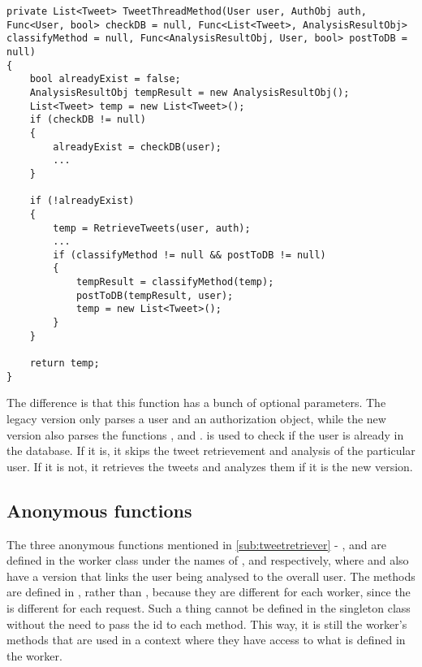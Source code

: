\begin{minipage}[H]{\linewidth}
\begin{lstlisting}[caption = The TweetThreadMethod function, label =
tweetthreadmethod]
private List<Tweet> TweetThreadMethod(User user, AuthObj auth, Func<User, bool> checkDB = null, Func<List<Tweet>, AnalysisResultObj> classifyMethod = null, Func<AnalysisResultObj, User, bool> postToDB = null)
{
    bool alreadyExist = false;
    AnalysisResultObj tempResult = new AnalysisResultObj();
    List<Tweet> temp = new List<Tweet>();
    if (checkDB != null)
    {
        alreadyExist = checkDB(user);
		...
    }

    if (!alreadyExist)
    {
        temp = RetrieveTweets(user, auth);
		...	
        if (classifyMethod != null && postToDB != null)
        {
            tempResult = classifyMethod(temp); 
            postToDB(tempResult, user); 
            temp = new List<Tweet>();
        }
    }

    return temp;
}
\end{lstlisting}
\end{minipage}
The difference is that this function has a bunch of optional parameters. The legacy version only parses
a user and an authorization object, while the new version also parses the
functions ,  and .
 is used to check if the user is already in the database. If it
is, it skips the tweet retrievement and analysis of the particular user. If it is not, it retrieves the tweets and analyzes them if it
is the new version.\\

\subsection{Anonymous functions}
The three anonymous functions mentioned in \autoref{sub:tweetretriever} -
,  and  are defined in the
worker class under the names of ,
 and  respectively, where
 and  also have a version
that links the user being analysed to the overall user. The methods are
defined in , rather than , because they are
different for each worker, since the  is different for each
request. Such a thing cannot be defined in the singleton class without the need
to pass the id to each method.
This way, it is still the worker's methods that are used in a context where they
have access to what is defined in the worker.


